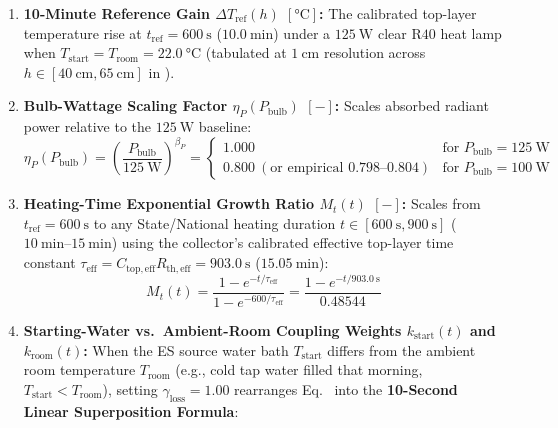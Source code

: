 \begin{enumerate}
  \item \textbf{10-Minute Reference Gain $\Delta T_{\mathrm{ref}}(h)$ $[\si{\celsius}]$:} The calibrated top-layer temperature rise at $t_{\mathrm{ref}} = \SI{600}{\second}$ ($\SI{10.0}{\minute}$) under a $\SI{125}{\watt}$ clear $\mathrm{R40}$ heat lamp when $T_{\mathrm{start}} = T_{\mathrm{room}} = \SI{22.0}{\celsius}$ (tabulated at $\SI{1}{\centi\meter}$ resolution across $h \in [\SI{40}{\centi\meter}, \SI{65}{\centi\meter}]$ in ).
  \item \textbf{Bulb-Wattage Scaling Factor $\eta_P(P_{\mathrm{bulb}})$ $[-]$:} Scales absorbed radiant power relative to the $\SI{125}{\watt}$ baseline:
  \begin{equation}\label{eq:16:wattage-scale}
    \eta_P(P_{\mathrm{bulb}}) = \left(\frac{P_{\mathrm{bulb}}}{\SI{125}{\watt}}\right)^{\!\beta_P} = \begin{cases} 1.000 & \text{for } P_{\mathrm{bulb}} = \SI{125}{\watt} \\ 0.800\ (\text{or empirical } 0.798\text{--}0.804) & \text{for } P_{\mathrm{bulb}} = \SI{100}{\watt} \end{cases}
  \end{equation}
  \item \textbf{Heating-Time Exponential Growth Ratio $M_t(t)$ $[-]$:} Scales from $t_{\mathrm{ref}} = \SI{600}{\second}$ to any State/National heating duration $t \in [\SI{600}{\second}, \SI{900}{\second}]$ ($\SIrange{10}{15}{\minute}$) using the collector's calibrated effective top-layer time constant $\tau_{\mathrm{eff}} = C_{\mathrm{top,eff}}R_{\mathrm{th,eff}} = \SI{903.0}{\second}$ ($\SI{15.05}{\minute}$):
  \begin{equation}\label{eq:16:time-multiplier}
    M_t(t) = \frac{1 - e^{-t/\tau_{\mathrm{eff}}}}{1 - e^{-600/\tau_{\mathrm{eff}}}} = \frac{1 - e^{-t/\SI{903.0}{\second}}}{0.48544}
  \end{equation}
  \item \textbf{Starting-Water vs.\ Ambient-Room Coupling Weights $k_{\mathrm{start}}(t)$ and $k_{\mathrm{room}}(t)$:} When the ES source water bath $T_{\mathrm{start}}$ differs from the ambient room temperature $T_{\mathrm{room}}$ (e.g., cold tap water filled that morning, $T_{\mathrm{start}} < T_{\mathrm{room}}$), setting $\gamma_{\mathrm{loss}} = 1.00$ rearranges Eq.~ into the \textbf{10-Second Linear Superposition Formula}:
  \begin{equation}\label{eq:16:fast-superposition}

\end{equation}
\end{enumerate}
